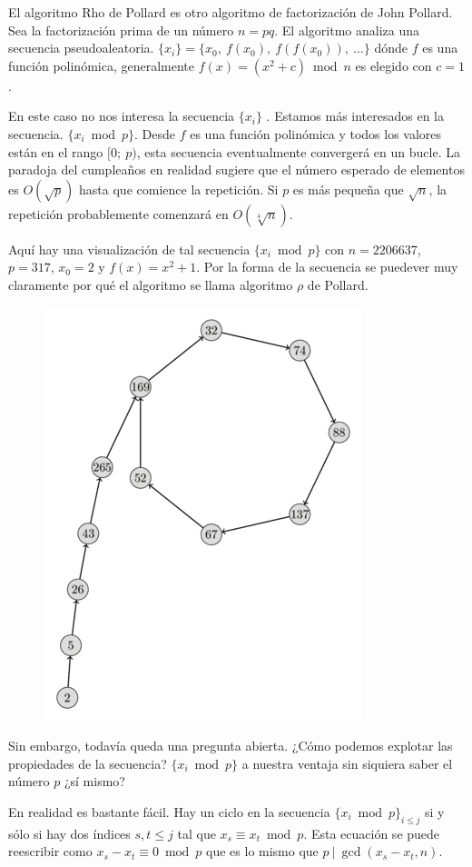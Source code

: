 El algoritmo Rho de Pollard es otro algoritmo de factorización de John Pollard.  Sea la factorización prima de un número $n = p q$. El algoritmo analiza una secuencia pseudoaleatoria. $\{x_i\} = \{x_0,~f(x_0),~f(f(x_0)),~\dots\}$ dónde $f$ es una función polinómica, generalmente $f(x) = (x^2 + c) \bmod n$  es elegido con $c = 1$.

En este caso no nos interesa la secuencia $\{x_i\}$ . Estamos más interesados en la secuencia. $\{x_i \bmod p\}$. Desde $f$ es una función polinómica y todos los valores están en el rango $[0;~p)$, esta secuencia eventualmente convergerá en un bucle. La paradoja del cumpleaños en realidad sugiere que el número esperado de elementos es $O(\sqrt{p})$ hasta que comience la repetición. Si $p$ es más pequeña que $\sqrt{n}$, la repetición probablemente comenzará en $O(\sqrt[4]{n})$.


Aquí hay una visualización de tal secuencia $\{x_i \bmod p\}$ con $n = 2206637$, $p = 317$, $x_0 = 2$ y $f(x) = x^2 + 1$. Por la forma de la secuencia se puedever muy claramente por qué el algoritmo se llama algoritmo $\rho$ de Pollard.

\begin{figure}[h!]
	\centering
	\includegraphics[width=0.35\linewidth]{img/pollard_rho}
	
	\label{fig:pollardrho}
\end{figure}


Sin embargo, todavía queda una pregunta abierta. ¿Cómo podemos explotar las propiedades de la secuencia? $\{x_i \bmod p\}$ a nuestra ventaja sin siquiera saber el número $p$ ¿sí mismo?

En realidad es bastante fácil. Hay un ciclo en la secuencia $\{x_i \bmod p\}_{i \le j}$ si y sólo si hay dos índices $s, t \le j$ tal que $x_s \equiv x_t \bmod p$. Esta ecuación se
puede reescribir como $x_s - x_t \equiv 0 \bmod p$ que es lo mismo que $p ~|~ \gcd(x_s - x_t, n)$.

